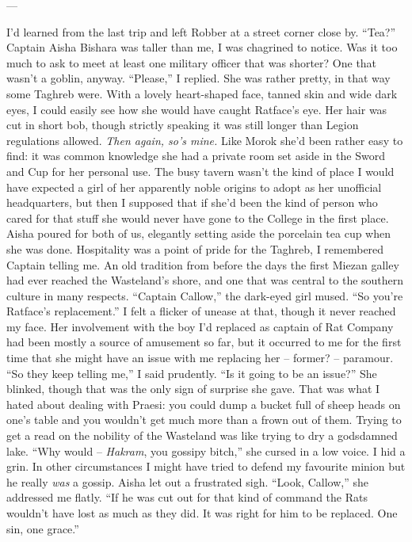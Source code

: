 \documentclass[12pt, openany]{book}
\begin{document}
—

I’d learned from the last trip and left Robber at a street corner close by.
“Tea?”
Captain Aisha Bishara was taller than me, I was chagrined to notice. Was it too much to ask to meet at least one military officer that was shorter? One that wasn’t a goblin, anyway.
“Please,” I replied.
She was rather pretty, in that way some Taghreb were. With a lovely heart-shaped face, tanned skin and wide dark eyes, I could easily see how she would have caught Ratface’s eye. Her hair was cut in short bob, though strictly speaking it was still longer than Legion regulations allowed. \textit{Then again, so’s mine.} Like Morok she’d been rather easy to find: it was common knowledge she had a private room set aside in the Sword and Cup for her personal use. The busy tavern wasn’t the kind of place I would have expected a girl of her apparently noble origins to adopt as her unofficial headquarters, but then I supposed that if she’d been the kind of person who cared for that stuff she would never have gone to the College in the first place. Aisha poured for both of us, elegantly setting aside the porcelain tea cup when she was done. Hospitality was a point of pride for the Taghreb, I remembered Captain telling me. An old tradition from before the days the first Miezan galley had ever reached the Wasteland’s shore, and one that was central to the southern culture in many respects.
“Captain Callow,” the dark-eyed girl mused. “So you’re Ratface’s replacement.”
I felt a flicker of unease at that, though it never reached my face. Her involvement with the boy I’d replaced as captain of Rat Company had been mostly a source of amusement so far, but it occurred to me for the first time that she might have an issue with me replacing her – former? – paramour.
“So they keep telling me,” I said prudently. “Is it going to be an issue?”
She blinked, though that was the only sign of surprise she gave. That was what I hated about dealing with Praesi: you could dump a bucket full of sheep heads on one’s table and you wouldn’t get much more than a frown out of them. Trying to get a read on the nobility of the Wasteland was like trying to dry a godsdamned lake.
“Why would – \textit{Hakram}, you gossipy bitch,” she cursed in a low voice.
I hid a grin. In other circumstances I might have tried to defend my favourite minion but he really \textit{was} a gossip. Aisha let out a frustrated sigh.
“Look, Callow,” she addressed me flatly. “If he was cut out for that kind of command the Rats wouldn’t have lost as much as they did. It was right for him to be replaced. One sin, one grace.”
\end{document}
